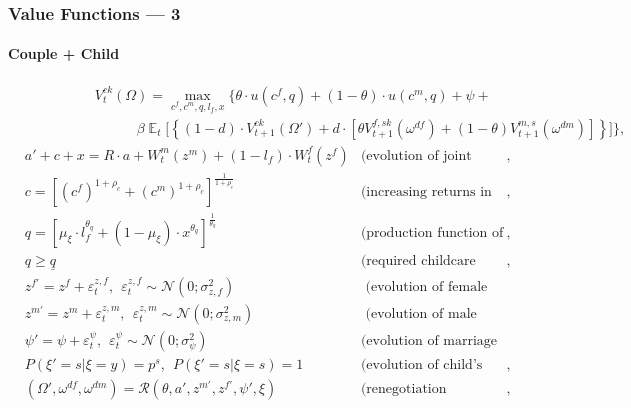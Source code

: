 \documentclass{beamer}
\DeclareMathOperator{\E}{\mathbb{E}}
\begin{document}
\begin{frame}[label=value-functions]
\frametitle{Value Functions --- 3}
\framesubtitle{Couple + Child}
\hspace{-2em}
{\scriptsize
\begin{align}& \hspace{5em}  V^{ck}_t(\Omega) = \max\limits_{c^f,c^m,q,l_f,x}  \bigg\{ \theta\cdot u(c^f,q) + (1-\theta)\cdot u(c^m,q) + \psi + \nonumber \\  \nonumber
 & \hspace{8em} \beta \E_t \Big[   \left\{ (1-d)\cdot   V^{ck}_{t+1}(\Omega') + d\cdot [ \theta V_{t+1}^{f,sk}(\omega^{df}) + (1-\theta)V_{t+1}^{m,s}(\omega^{dm})]\right\} \Big] \bigg\},
\end{align}\vspace{-2em}
\begin{align*}
 & a' + c + x = R\cdot a  + W^m_t(z^m) + (1-l_f)\cdot W^f_t(z^f) & \text{(evolution of joint assets)},\\
                    & c = [(c^f)^{1+\rho_c} + (c^m)^{1+\rho_c}]^{\frac1{1+\rho_c}} & \text{(increasing returns in consumption)},\\
                    & q = [\mu_\xi\cdot l_f^{\theta_q} + (1-\mu_\xi)\cdot x^{\theta_q}]^{\frac1{\theta_q}} & \text{(production function of child quality)},\\
                    & q \geq \underline{q} & \text{(required childcare costs)},\\
                    &  z^{f\prime} = z^f + \varepsilon^{z,f}_t, \ \ \varepsilon^{z,f}_t \sim \mathcal{N}(0;\sigma_{z,f}^2) &  \text{ (evolution of female productivity)}\\
				 &  z^{m\prime} = z^m + \varepsilon^{z,m}_t, \ \ \varepsilon^{z,m}_t \sim \mathcal{N}(0;\sigma_{z,m}^2) &  \text{ (evolution of male productivity)}\\
                    & \psi' = \psi + \varepsilon^{\psi}_t, \ \ \varepsilon^{\psi}_t \sim \mathcal{N}(0;\sigma_{\psi}^2)  & \text{(evolution of marriage surplus),} \\
                   &  P(\xi' = s | \xi = y) = p^s, \ \ P(\xi' = s | \xi = s) = 1 & \text{(evolution of child's age)},\\
                    & (\Omega',\omega^{df},\omega^{dm}) = \mathcal{R}(\theta,a',z^{m\prime},z^{f\prime},\psi',\xi) & \text{(renegotiation correspondence)},
\end{align*}
}
\hyperlink{utilities}{}
\end{frame}
\end{document}
